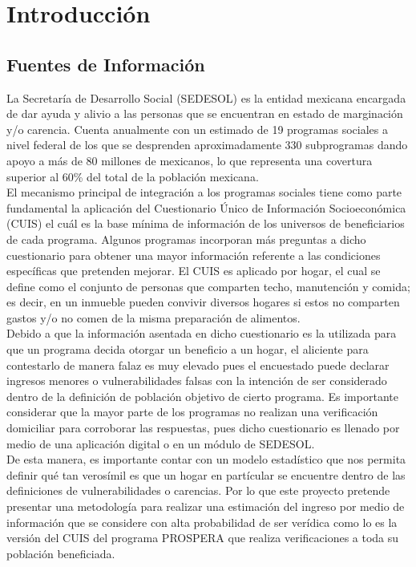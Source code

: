 \chapter{Introducción}
\section{Fuentes de Información}
La Secretaría de Desarrollo Social (SEDESOL) es la entidad mexicana encargada de dar ayuda y alivio a las personas que se encuentran en estado de marginación y/o carencia. Cuenta anualmente con un estimado de 19 programas sociales a nivel federal de los que se desprenden aproximadamente 330 subprogramas dando apoyo a más de 80 millones de mexicanos, lo que representa una covertura superior al 60\% del total de la población mexicana.\\
El mecanismo principal de integración a los programas sociales tiene como parte fundamental la aplicación del Cuestionario Único de Información Socioeconómica (CUIS)\cite{cuis} el cuál es la base mínima de información de los universos de beneficiarios de cada programa. Algunos programas incorporan más preguntas a dicho cuestionario para obtener una mayor información referente a las condiciones específicas que pretenden mejorar. El CUIS es aplicado por hogar, el cual se define como el conjunto de personas que comparten techo, manutención y comida; es decir, en un inmueble pueden convivir diversos hogares si estos no comparten gastos y/o no comen de la misma preparación de alimentos.\\
Debido a que la información asentada en dicho cuestionario es la utilizada para que un programa decida otorgar un beneficio a un hogar, el aliciente para contestarlo de manera falaz es muy elevado pues el encuestado puede declarar ingresos menores o vulnerabilidades falsas con la intención de ser considerado dentro de la definición de población objetivo de cierto programa. Es importante considerar que la mayor parte de los programas no realizan una verificación domiciliar para corroborar las respuestas, pues dicho cuestionario es llenado por medio de una aplicación digital o en un módulo de SEDESOL.\\
De esta manera, es importante contar con un modelo estadístico que nos permita definir qué tan verosímil es que un hogar en partícular se encuentre dentro de las definiciones de vulnerabilidades o carencias. Por lo que este proyecto pretende presentar una metodología para realizar una estimación del ingreso por medio de información que se considere con alta probabilidad de ser verídica como lo es la versión del CUIS del programa PROSPERA\cite{prospera} que realiza verificaciones a toda su población beneficiada.\\
